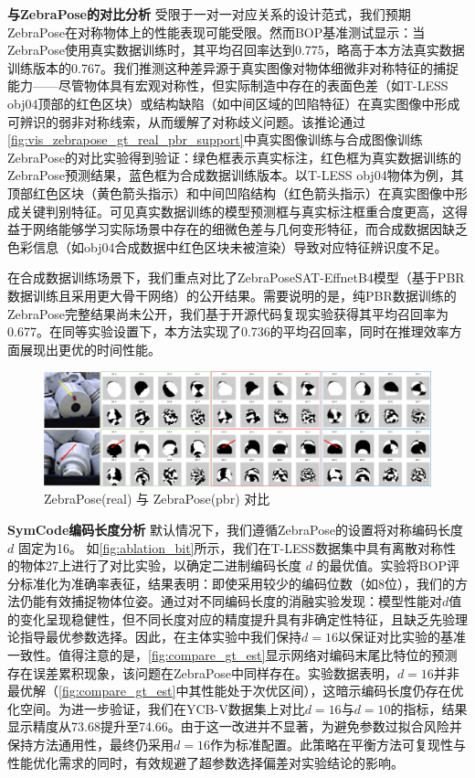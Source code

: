 \textbf{与ZebraPose的对比分析 } 受限于一对一对应关系的设计范式，我们预期ZebraPose在对称物体上的性能表现可能受限。然而BOP基准测试显示：当ZebraPose使用真实数据训练时，其平均召回率达到0.775，略高于本方法真实数据训练版本的0.767。我们推测这种差异源于真实图像对物体细微非对称特征的捕捉能力——尽管物体具有宏观对称性，但实际制造中存在的表面色差（如T-LESS obj04顶部的红色区块）或结构缺陷（如中间区域的凹陷特征）在真实图像中形成可辨识的弱非对称线索，从而缓解了对称歧义问题。该推论通过\autoref{fig:vis_zebrapose_gt_real_pbr_support}中真实图像训练与合成图像训练ZebraPose的对比实验得到验证：绿色框表示真实标注，红色框为真实数据训练的ZebraPose预测结果，蓝色框为合成数据训练版本。以T-LESS obj04物体为例，其顶部红色区块（黄色箭头指示）和中间凹陷结构（红色箭头指示）在真实图像中形成关键判别特征。可见真实数据训练的模型预测框与真实标注框重合度更高，这得益于网络能够学习实际场景中存在的细微色差与几何变形特征，而合成数据因缺乏色彩信息（如obj04合成数据中红色区块未被渲染）导致对应特征辨识度不足。

\par 在合成数据训练场景下，我们重点对比了ZebraPoseSAT-EffnetB4模型（基于PBR数据训练且采用更大骨干网络）的公开结果。需要说明的是，纯PBR数据训练的ZebraPose完整结果尚未公开，我们基于开源代码复现实验获得其平均召回率为0.677。在同等实验设置下，本方法实现了0.736的平均召回率，同时在推理效率方面展现出更优的时间性能。

\begin{figure}[ht]
        \centerline{\includegraphics[width=1.0\textwidth]{figure/symnet/vis_zebrapose_gt_real_pbr_support.jpg}}
        \caption{ZebraPose(real) 与 ZebraPose(pbr) 对比}
        \label{fig:vis_zebrapose_gt_real_pbr_support}
\end{figure}

\textbf{SymCode编码长度分析 } 默认情况下，我们遵循ZebraPose\cite{su2022zebrapose}的设置将对称编码长度 $d$ 固定为16。 如\autoref{fig:ablation_bit}所示，我们在T-LESS数据集中具有离散对称性的物体27上进行了对比实验，以确定二进制编码长度 $d$ 的最优值。实验将BOP评分标准化为准确率表征，结果表明：即使采用较少的编码位数（如8位），我们的方法仍能有效捕捉物体位姿。通过对不同编码长度的消融实验发现：模型性能对$d$值的变化呈现稳健性，但不同长度对应的精度提升具有非确定性特征，且缺乏先验理论指导最优参数选择。因此，在主体实验中我们保持$d=16$以保证对比实验的基准一致性。值得注意的是，\autoref{fig:compare_gt_est}显示网络对编码末尾比特位的预测存在误差累积现象，该问题在ZebraPose中同样存在。实验数据表明，$d=16$并非最优解（\autoref{fig:compare_gt_est}中其性能处于次优区间），这暗示编码长度仍存在优化空间。为进一步验证，我们在YCB-V数据集上对比$d=16$与$d=10$的指标，结果显示精度从73.68提升至74.66。由于这一改进并不显著，为避免参数过拟合风险并保持方法通用性，最终仍采用$d=16$作为标准配置。此策略在平衡方法可复现性与性能优化需求的同时，有效规避了超参数选择偏差对实验结论的影响。

